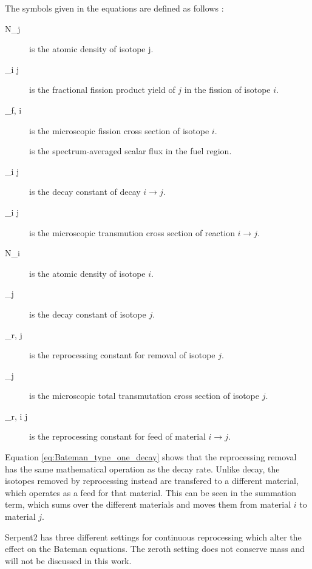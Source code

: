 The symbols given in the equations are defined as follows \cite{leppanen_development_2007}:
\begin{description}
\item[N_j] is the atomic density of isotope j.
\item[\gamma_{i \rightarrow j}] is the fractional fission product yield of $j$ in the fission of isotope $i$.
\item[\sigma_{f, i}] is the microscopic fission cross section of isotope $i$.
\item[\Phi] is the spectrum-averaged scalar flux in the fuel region.
\item[\lambda _{i \rightarrow j}] is the decay constant of decay $i \rightarrow j$.
\item[\sigma_{i \rightarrow j}] is the microscopic transmution cross section of reaction $i \rightarrow j$.
\item[N_i] is the atomic density of isotope $i$.
\item[\lambda_j] is the decay constant of isotope $j$.
\item[\lambda_{r, j}] is the reprocessing constant for removal of isotope $j$.
\item[\sigma_j] is the microscopic total transmutation cross section of isotope $j$.
\item[\lambda _{r, i \rightarrow j}] is the reprocessing constant for feed of material $i \rightarrow j$.
\end{description}

Equation \eqref{eq:Bateman_type_one_decay} shows that the reprocessing removal has the same mathematical operation as the decay rate. Unlike decay, the isotopes removed by reprocessing instead are transfered to a different material, which operates as a feed for that material. This can be seen in the summation term, which sums over the different materials and moves them from material $i$ to material $j$.

Serpent2 has three different settings for continuous reprocessing which alter the effect on the Bateman equations. The zeroth setting does not conserve mass and will not be discussed in this work. 

